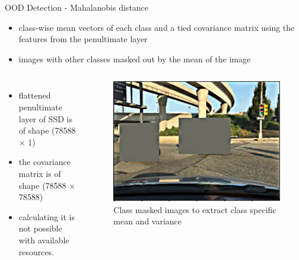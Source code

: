 \documentclass[10pt, aspectratio=169]{beamer}
\begin{document}
\begin{frame}[allowframebreaks]{OOD Detection - Mahalanobis distance}
    \begin{itemize}
        \item class-wise mean vectors of each class and a tied covariance matrix using the features from the penultimate layer
        \item images with other classes masked out by the mean of the image
    \end{itemize}
    \begin{columns}
            \begin{itemize}
                \item flattened penultimate layer of SSD is of shape (78588 × 1)
                \item the covariance matrix is of shape (78588 × 78588)
                \item calculating it is not possible with
                available resources.
            \end{itemize}
            \begin{figure}[!ht]
                \centering
                \includegraphics[scale=0.125]{images/rsz_1classspecific-image.png}
                \caption[SSD framework]{Class masked images to extract class specific mean and variance}
            \end{figure}
    \end{columns}
\end{frame}
\end{document}
